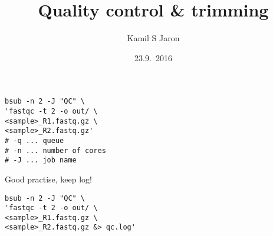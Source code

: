 \documentclass[xcolor=dvipsnames]{beamer}
\title[ ]{Quality control \& trimming}
\author{Kamil S Jaron}
\date{23.9.~2016}
\begin{document}
\begin{frame}
	\titlepage
\end{frame}

\begin{frame}[fragile]
\LARGE
\begin{verbatim}
bsub -n 2 -J "QC" \
'fastqc -t 2 -o out/ \
<sample>_R1.fastq.gz \
<sample>_R2.fastq.gz'
# -q ... queue
# -n ... number of cores
# -J ... job name
\end{verbatim}
\end{frame}

\begin{frame}[fragile]
Good practise, keep log!
\LARGE
\begin{verbatim}
bsub -n 2 -J "QC" \
'fastqc -t 2 -o out/ \
<sample>_R1.fastq.gz \
<sample>_R2.fastq.gz &> qc.log'
\end{verbatim}
\end{frame}
\end{document}
